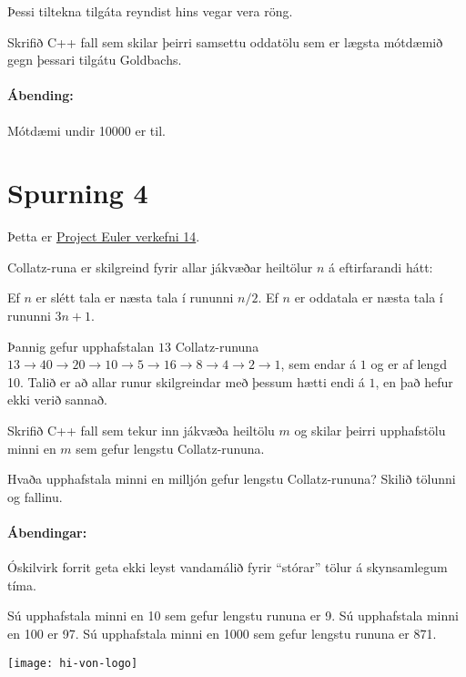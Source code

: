 \documentclass{article}
\begin{document}
Þessi tiltekna tilgáta reyndist hins vegar vera röng.

Skrifið C++ fall sem skilar þeirri samsettu oddatölu sem er lægsta mótdæmið gegn þessari tilgátu Goldbachs.

\paragraph{Ábending:} Mótdæmi undir 10000 er til.

\section{Spurning 4}
Þetta er \href{https://projecteuler.net/problem=14}{Project Euler verkefni 14}.

Collatz-runa er skilgreind fyrir allar jákvæðar heiltölur $n$ á eftirfarandi hátt:

Ef $n$ er slétt tala er næsta tala í rununni $n/2$. Ef $n$ er oddatala er næsta tala í rununni $3n +1$.

Þannig gefur upphafstalan $13$ Collatz-rununa $13 \to 40 \to 20 \to 10 \to 5 \to 16 \to 8 \to 4 \to 2 \to 1$, sem endar á $1$ og er af lengd 10. Talið er að allar runur skilgreindar með þessum hætti endi á $1$, en það hefur ekki verið sannað.

Skrifið C++ fall sem tekur inn jákvæða heiltölu $m$ og skilar þeirri upphafstölu minni en $m$ sem gefur lengstu Collatz-rununa.

Hvaða upphafstala minni en milljón gefur lengstu Collatz-rununa? Skilið tölunni og fallinu.

\paragraph{Ábendingar:} Óskilvirk forrit geta ekki leyst vandamálið fyrir ``stórar'' tölur á skynsamlegum tíma.

Sú upphafstala minni en 10 sem gefur lengstu rununa er 9. Sú upphafstala minni en 100 er 97. Sú upphafstala minni en 1000 sem gefur lengstu rununa er 871.

\vfill
\texttt{[image: hi-von-logo]}
\end{document}
